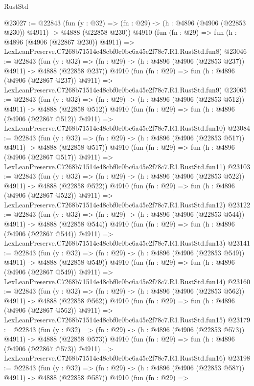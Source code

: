 \begin{lexlean}{RustStd}
\begin{coremodule}
@23027 := @22843
    (fun (y : @32) => (fn : @29) -> (h : @4896 (@4906 (@22853 @230)) @4911) -> @4888 (@22858 @230))
    @4910
    (fun (fn : @29) =>
    fun (h : @4896 (@4906 (@22867 @230)) @4911) =>
    LexLeanPreserve.C7268b71514e48cbf0c0bc6a45e2f78c7.R1.RustStd.fun8)
@23046 := @22843
    (fun (y : @32) => (fn : @29) -> (h : @4896 (@4906 (@22853 @237)) @4911) -> @4888 (@22858 @237))
    @4910
    (fun (fn : @29) =>
    fun (h : @4896 (@4906 (@22867 @237)) @4911) =>
    LexLeanPreserve.C7268b71514e48cbf0c0bc6a45e2f78c7.R1.RustStd.fun9)
@23065 := @22843
    (fun (y : @32) => (fn : @29) -> (h : @4896 (@4906 (@22853 @512)) @4911) -> @4888 (@22858 @512))
    @4910
    (fun (fn : @29) =>
    fun (h : @4896 (@4906 (@22867 @512)) @4911) =>
    LexLeanPreserve.C7268b71514e48cbf0c0bc6a45e2f78c7.R1.RustStd.fun10)
@23084 := @22843
    (fun (y : @32) => (fn : @29) -> (h : @4896 (@4906 (@22853 @517)) @4911) -> @4888 (@22858 @517))
    @4910
    (fun (fn : @29) =>
    fun (h : @4896 (@4906 (@22867 @517)) @4911) =>
    LexLeanPreserve.C7268b71514e48cbf0c0bc6a45e2f78c7.R1.RustStd.fun11)
@23103 := @22843
    (fun (y : @32) => (fn : @29) -> (h : @4896 (@4906 (@22853 @522)) @4911) -> @4888 (@22858 @522))
    @4910
    (fun (fn : @29) =>
    fun (h : @4896 (@4906 (@22867 @522)) @4911) =>
    LexLeanPreserve.C7268b71514e48cbf0c0bc6a45e2f78c7.R1.RustStd.fun12)
@23122 := @22843
    (fun (y : @32) => (fn : @29) -> (h : @4896 (@4906 (@22853 @544)) @4911) -> @4888 (@22858 @544))
    @4910
    (fun (fn : @29) =>
    fun (h : @4896 (@4906 (@22867 @544)) @4911) =>
    LexLeanPreserve.C7268b71514e48cbf0c0bc6a45e2f78c7.R1.RustStd.fun13)
@23141 := @22843
    (fun (y : @32) => (fn : @29) -> (h : @4896 (@4906 (@22853 @549)) @4911) -> @4888 (@22858 @549))
    @4910
    (fun (fn : @29) =>
    fun (h : @4896 (@4906 (@22867 @549)) @4911) =>
    LexLeanPreserve.C7268b71514e48cbf0c0bc6a45e2f78c7.R1.RustStd.fun14)
@23160 := @22843
    (fun (y : @32) => (fn : @29) -> (h : @4896 (@4906 (@22853 @562)) @4911) -> @4888 (@22858 @562))
    @4910
    (fun (fn : @29) =>
    fun (h : @4896 (@4906 (@22867 @562)) @4911) =>
    LexLeanPreserve.C7268b71514e48cbf0c0bc6a45e2f78c7.R1.RustStd.fun15)
@23179 := @22843
    (fun (y : @32) => (fn : @29) -> (h : @4896 (@4906 (@22853 @573)) @4911) -> @4888 (@22858 @573))
    @4910
    (fun (fn : @29) =>
    fun (h : @4896 (@4906 (@22867 @573)) @4911) =>
    LexLeanPreserve.C7268b71514e48cbf0c0bc6a45e2f78c7.R1.RustStd.fun16)
@23198 := @22843
    (fun (y : @32) => (fn : @29) -> (h : @4896 (@4906 (@22853 @587)) @4911) -> @4888 (@22858 @587))
    @4910
    (fun (fn : @29) =>

\end{coremodule}
\end{lexlean}
